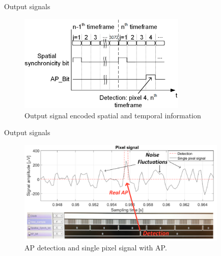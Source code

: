 \documentclass{beamer}
\begin{document}
\begin{frame}{Output signals} 
\begin{figure}
    \vspace{-0.6cm}
    \includegraphics[width=8cm]{bitflag.png}
    \caption{Output signal encoded spatial and temporal information}
\end{figure}
\end{frame}
\begin{frame}{Output signals} 
\begin{figure}
    \vspace{-0.6cm}
    \includegraphics[width=10cm]{Output.png}
    \caption{AP detection and single pixel signal with AP.}
\end{figure}
\end{frame}	









\end{document}
